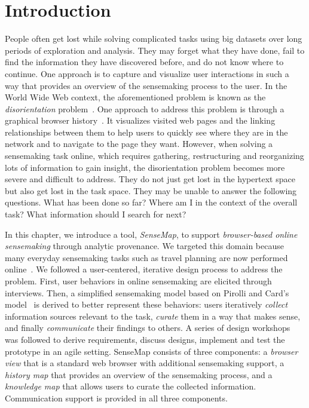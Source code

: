 \section{Introduction}
People often get lost while solving complicated tasks using big datasets over long periods of exploration and analysis. They may forget what they have done, fail to find the information they have discovered before, and do not know where to continue. One approach is to capture and visualize user interactions in such a way that provides an overview of the sensemaking process to the user. In the World Wide Web context, the aforementioned problem is known as the \textit{disorientation} problem~\cite{Conklin1987}. One approach to address this problem is through a graphical browser history~\cite{Ayers1995,Hightower1998,Milic-Frayling2003}. It visualizes visited web pages and the linking relationships between them to help users to quickly see where they are in the network and to navigate to the page they want. However, when solving a sensemaking task online, which requires gathering, restructuring and reorganizing lots of information to gain insight, the disorientation problem becomes more severe and difficult to address. They do not just get lost in the hypertext space but also get lost in the task space. They may be unable to answer the following questions. What has been done so far? Where am I in the context of the overall task? What information should I search for next?

In this chapter, we introduce a tool, \emph{SenseMap}, to support \textit{browser-based online sensemaking} through analytic provenance. We targeted this domain because many everyday sensemaking tasks such as travel planning are now performed online~\cite{Russell2008}.
We followed a user-centered, iterative design process to address the problem. First, user behaviors in online sensemaking are elicited through interviews. Then, a simplified sensemaking model based on Pirolli and Card's model~\cite{Pirolli2005} is derived to better represent these behaviors: users iteratively \textit{collect} information sources relevant to the task, \textit{curate} them in a way that makes sense, and finally \textit{communicate} their findings to others. A series of design workshops was followed to derive requirements, discuss designs, implement and test the prototype in an agile setting. SenseMap consists of three components: a \emph{browser view} that is a standard web browser with additional sensemaking support, a \emph{history map} that provides an overview of the sensemaking process, and a \emph{knowledge map} that allows users to curate the collected information. Communication support is provided in all three components.

